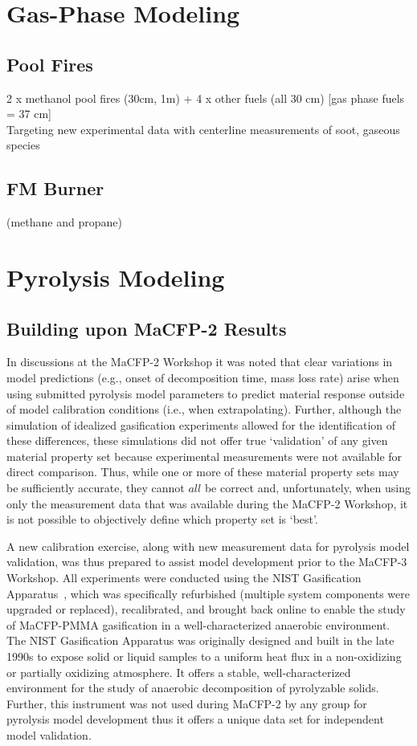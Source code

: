 \documentclass[12pt]{article}
\begin{document}
\clearpage
\section{Gas-Phase Modeling}
\label{Sec:Gas Phase}
\subsection{Pool Fires}
2 x methanol pool fires (30cm, 1m) + 4 x other fuels (all 30 cm) [gas phase fuels = 37 cm]\\
Targeting new experimental data with centerline measurements of soot, gaseous species

\subsection{FM Burner}
(methane and propane)

\clearpage
\section{Pyrolysis Modeling}
\label{Sec:Pyrolysis}
\subsection{Building upon MaCFP-2 Results}
In discussions at the MaCFP-2 Workshop it was noted that clear variations in model predictions (e.g., onset of decomposition time, mass loss rate) arise when using submitted pyrolysis model parameters to predict material response outside of model calibration conditions (i.e., when extrapolating). Further, although the simulation of idealized gasification experiments allowed for the identification of these differences, these simulations did not offer true `validation' of any given material property set because experimental measurements were not available for direct comparison. Thus, while one or more of these material property sets may be sufficiently accurate, they cannot $all$ be correct and, unfortunately, when using only the measurement data that was available during the MaCFP-2 Workshop, it is not possible to objectively define which property set is `best'.

A new calibration exercise, along with new measurement data for pyrolysis model validation, was thus prepared to assist model development prior to the MaCFP-3 Workshop. All experiments were conducted using the NIST Gasification Apparatus~\cite{austin1998gasification}, which was specifically refurbished (multiple system components were upgraded or replaced), recalibrated, and brought back online to enable the study of MaCFP-PMMA gasification in a well-characterized anaerobic environment. The NIST Gasification Apparatus was originally designed and built in the late 1990s to expose solid or liquid samples to a uniform heat flux in a non-oxidizing or partially oxidizing atmosphere. It offers a stable, well-characterized environment for the study of anaerobic decomposition of pyrolyzable solids. Further, this instrument was not used during MaCFP-2 by any group for pyrolysis model development thus it offers a unique data set for independent model validation.
\end{document}
